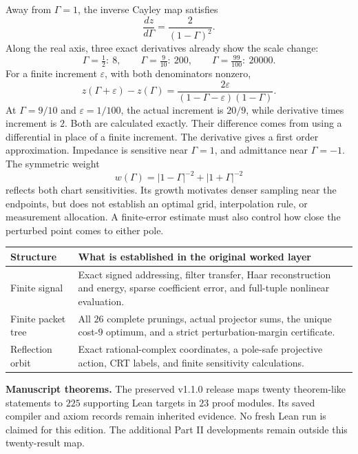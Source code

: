 Away from $\Gamma=1$, the inverse Cayley map satisfies
\[
\frac{dz}{d\Gamma}=\frac2{(1-\Gamma)^2}.
\]
Along the real axis, three exact derivatives already show the scale change:
\[
\Gamma=\tfrac12:\ 8,\qquad
\Gamma=\tfrac9{10}:\ 200,\qquad
\Gamma=\tfrac{99}{100}:\ 20000.
\]
For a finite increment $\varepsilon$, with both denominators nonzero,
\[
z(\Gamma+\varepsilon)-z(\Gamma)
=\frac{2\varepsilon}{(1-\Gamma-\varepsilon)(1-\Gamma)}.
\]
At $\Gamma=9/10$ and $\varepsilon=1/100$, the actual increment is $20/9$, while derivative times increment is $2$. Both are calculated exactly. Their difference comes from using a differential in place of a finite increment. The derivative gives a first order approximation.
Impedance is sensitive near $\Gamma=1$, and admittance near $\Gamma=-1$. The symmetric weight
\[
w(\Gamma)=|1-\Gamma|^{-2}+|1+\Gamma|^{-2}
\]
reflects both chart sensitivities. Its growth motivates denser sampling near the endpoints, but does not establish an optimal grid, interpolation rule, or measurement allocation. A finite-error estimate must also control how close the perturbed point comes to either pole.

\begin{tabularx}{\linewidth}{@{}p{.24\linewidth}X@{}}
\toprule
Structure & What is established in the original worked layer\\\midrule
Finite signal & Exact signed addressing, filter transfer, Haar reconstruction and energy, sparse coefficient error, and full-tuple nonlinear evaluation.\\
Finite packet tree & All $26$ complete prunings, actual projector sums, the unique cost-$9$ optimum, and a strict perturbation-margin certificate.\\
Reflection orbit & Exact rational-complex coordinates, a pole-safe projective action, CRT labels, and finite sensitivity calculations.\\\bottomrule
\end{tabularx}
\textbf{Manuscript theorems.} The preserved v1.1.0 release maps twenty theorem-like statements to $225$ supporting Lean targets in $23$ proof modules. Its saved compiler and axiom records remain inherited evidence. No fresh Lean run is claimed for this edition. The additional Part II developments remain outside this twenty-result map.


